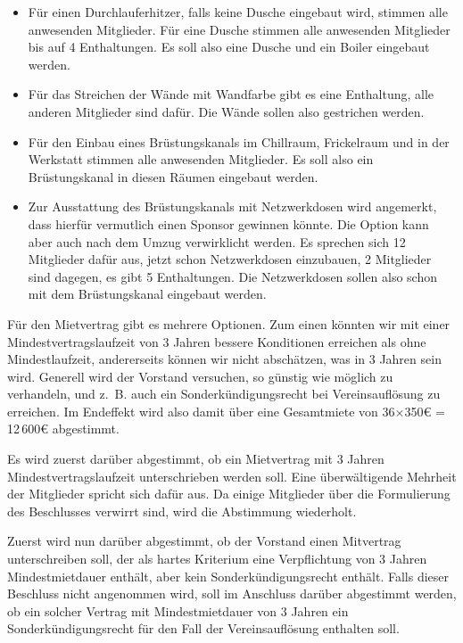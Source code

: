 \documentclass[a4paper,12pt]{scrartcl}
\begin{document}
\begin{itemize}
  \item {}    
    Für einen Durchlauferhitzer, falls keine Dusche eingebaut wird, stimmen
    alle anwesenden Mitglieder. Für eine Dusche stimmen alle anwesenden
    Mitglieder bis auf 4 Enthaltungen. Es soll also eine Dusche und ein Boiler
    eingebaut werden.
  \item {}
    Für das Streichen der Wände mit Wandfarbe gibt es eine Enthaltung, alle
    anderen Mitglieder sind dafür. Die Wände sollen also gestrichen werden.
  \item {}
    Für den Einbau eines Brüstungskanals im Chillraum, Frickelraum und in der
    Werkstatt stimmen alle anwesenden Mitglieder. Es soll also ein
    Brüstungskanal in diesen Räumen eingebaut werden.
  \item {}
    \enlargethispage{\baselineskip}
    Zur Ausstattung des Brüstungskanals mit Netzwerkdosen wird angemerkt, dass
    hierfür vermutlich einen Sponsor gewinnen könnte. Die Option kann aber
    auch nach dem Umzug verwirklicht werden. Es sprechen sich 12 Mitglieder
    dafür aus, jetzt schon Netzwerkdosen einzubauen, 2 Mitglieder sind dagegen,
    es gibt 5 Enthaltungen. Die Netzwerkdosen sollen also schon mit dem
    Brüstungskanal eingebaut werden.
\end{itemize}

Für den Mietvertrag gibt es mehrere Optionen. Zum einen könnten wir mit einer
Mindestvertragslaufzeit von 3 Jahren bessere Konditionen erreichen als ohne
Mindestlaufzeit, andererseits können wir nicht abschätzen, was in 3 Jahren sein
wird. Generell wird der Vorstand versuchen, so günstig wie möglich zu
verhandeln, und z.~B. auch ein Sonderkündigungsrecht bei Vereinsauflösung zu
erreichen. Im Endeffekt wird also damit über eine Gesamtmiete von 36$\times$350€
= 12\,600€ abgestimmt.

Es wird zuerst darüber abgestimmt, ob ein Mietvertrag mit 3 Jahren
Mindestvertragslaufzeit unterschrieben werden soll. Eine überwältigende Mehrheit
der Mitglieder spricht sich dafür aus. Da einige Mitglieder über die 
Formulierung des Beschlusses verwirrt sind, wird die Abstimmung wiederholt.

Zuerst wird nun darüber abgestimmt, ob der Vorstand einen Mitvertrag
unterschreiben soll, der als hartes Kriterium eine Verpflichtung von 3 Jahren
Mindestmietdauer enthält, aber kein Sonderkündigungsrecht enthält. Falls dieser
Beschluss nicht angenommen wird, soll im Anschluss darüber abgestimmt werden, ob
ein solcher Vertrag mit Mindestmietdauer von 3 Jahren ein Sonderkündigungsrecht
für den Fall der Vereinsauflösung enthalten soll.
\end{document}
